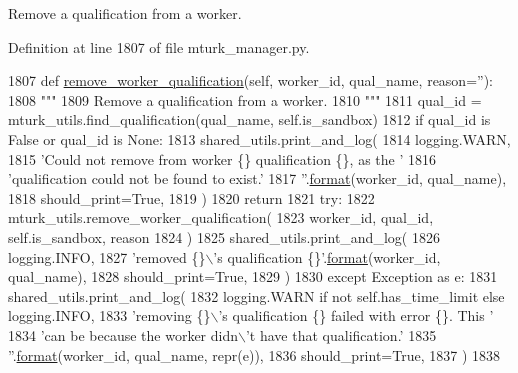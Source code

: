 \begin{DoxyVerb}Remove a qualification from a worker.
\end{DoxyVerb}
 

Definition at line 1807 of file mturk\+\_\+manager.\+py.


\begin{DoxyCode}
1807     \textcolor{keyword}{def }\hyperlink{namespaceparlai_1_1mturk_1_1core_1_1dev_1_1mturk__utils_abc2c057b91641179f7c4bb50dd916488}{remove\_worker\_qualification}(self, worker\_id, qual\_name, reason=''):
1808         \textcolor{stringliteral}{"""}
1809 \textcolor{stringliteral}{        Remove a qualification from a worker.}
1810 \textcolor{stringliteral}{        """}
1811         qual\_id = mturk\_utils.find\_qualification(qual\_name, self.is\_sandbox)
1812         \textcolor{keywordflow}{if} qual\_id \textcolor{keywordflow}{is} \textcolor{keyword}{False} \textcolor{keywordflow}{or} qual\_id \textcolor{keywordflow}{is} \textcolor{keywordtype}{None}:
1813             shared\_utils.print\_and\_log(
1814                 logging.WARN,
1815                 \textcolor{stringliteral}{'Could not remove from worker \{\} qualification \{\}, as the '}
1816                 \textcolor{stringliteral}{'qualification could not be found to exist.'}
1817                 \textcolor{stringliteral}{''}.\hyperlink{namespaceparlai_1_1chat__service_1_1services_1_1messenger_1_1shared__utils_a32e2e2022b824fbaf80c747160b52a76}{format}(worker\_id, qual\_name),
1818                 should\_print=\textcolor{keyword}{True},
1819             )
1820             \textcolor{keywordflow}{return}
1821         \textcolor{keywordflow}{try}:
1822             mturk\_utils.remove\_worker\_qualification(
1823                 worker\_id, qual\_id, self.is\_sandbox, reason
1824             )
1825             shared\_utils.print\_and\_log(
1826                 logging.INFO,
1827                 \textcolor{stringliteral}{'removed \{\}\(\backslash\)'s qualification \{\}'}.\hyperlink{namespaceparlai_1_1chat__service_1_1services_1_1messenger_1_1shared__utils_a32e2e2022b824fbaf80c747160b52a76}{format}(worker\_id, qual\_name),
1828                 should\_print=\textcolor{keyword}{True},
1829             )
1830         \textcolor{keywordflow}{except} Exception \textcolor{keyword}{as} e:
1831             shared\_utils.print\_and\_log(
1832                 logging.WARN \textcolor{keywordflow}{if} \textcolor{keywordflow}{not} self.has\_time\_limit \textcolor{keywordflow}{else} logging.INFO,
1833                 \textcolor{stringliteral}{'removing \{\}\(\backslash\)'s qualification \{\} failed with error \{\}. This '}
1834                 \textcolor{stringliteral}{'can be because the worker didn\(\backslash\)'t have that qualification.'}
1835                 \textcolor{stringliteral}{''}.\hyperlink{namespaceparlai_1_1chat__service_1_1services_1_1messenger_1_1shared__utils_a32e2e2022b824fbaf80c747160b52a76}{format}(worker\_id, qual\_name, repr(e)),
1836                 should\_print=\textcolor{keyword}{True},
1837             )
1838 
\end{DoxyCode}
